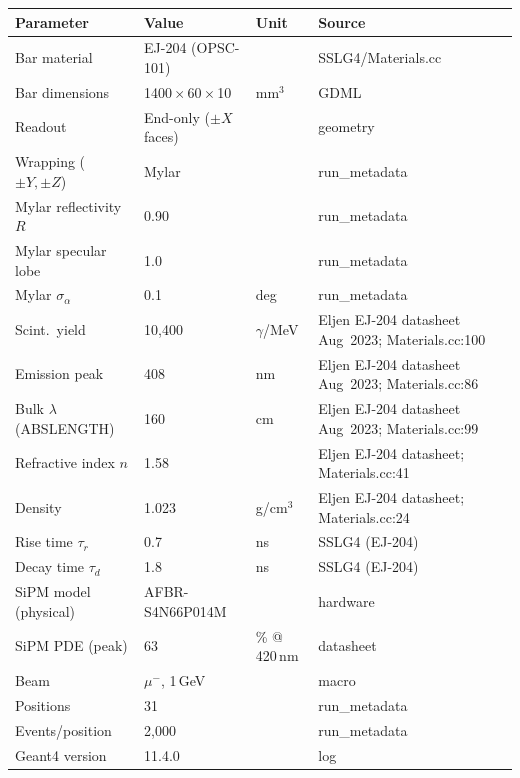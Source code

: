 \begin{tabular}{llll}\toprule
Parameter & Value & Unit & Source \\
\midrule
Bar material & EJ-204 (OPSC-101) &  & SSLG4/Materials.cc \\
Bar dimensions & 1400\,$\times$\,60\,$\times$\,10 & mm$^3$ & GDML \\
Readout & End-only ($\pm X$ faces) &  & geometry \\
Wrapping ($\pm Y,\pm Z$) & Mylar &  & run\_metadata \\
Mylar reflectivity $R$ & 0.90 &  & run\_metadata \\
Mylar specular lobe & 1.0 &  & run\_metadata \\
Mylar $\sigma_\alpha$ & 0.1 & deg & run\_metadata \\
Scint.~yield & 10,400 & $\gamma$/MeV & Eljen EJ-204 datasheet Aug~2023; Materials.cc:100 \\
Emission peak & 408 & nm & Eljen EJ-204 datasheet Aug~2023; Materials.cc:86 \\
Bulk $\lambda$ (ABSLENGTH) & 160 & cm & Eljen EJ-204 datasheet Aug~2023; Materials.cc:99 \\
Refractive index $n$ & 1.58 &  & Eljen EJ-204 datasheet; Materials.cc:41 \\
Density & 1.023 & g/cm$^3$ & Eljen EJ-204 datasheet; Materials.cc:24 \\
Rise time $\tau_r$ & 0.7 & ns & SSLG4 (EJ-204) \\
Decay time $\tau_d$ & 1.8 & ns & SSLG4 (EJ-204) \\
SiPM model (physical) & AFBR-S4N66P014M &  & hardware \\
SiPM PDE (peak) & 63 & \% @ 420\,nm & datasheet \\
Beam & $\mu^-$, 1\,GeV &  & macro \\
Positions & 31 &  & run\_metadata \\
Events/position & 2,000 &  & run\_metadata \\
Geant4 version & 11.4.0 &  & log \\
\bottomrule\end{tabular}
